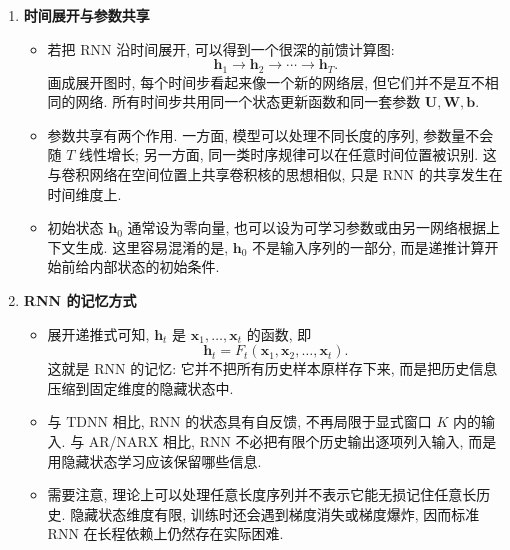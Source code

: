 \documentclass{../nndlcourse}
\begin{document}
\begin{enumerate}
  \item \textbf{时间展开与参数共享}
    \begin{itemize}
      \item 若把 RNN 沿时间展开, 可以得到一个很深的前馈计算图:
      \begin{equation*}
        \boldsymbol{h}_1 \rightarrow \boldsymbol{h}_2 \rightarrow \cdots \rightarrow \boldsymbol{h}_T.
      \end{equation*}
      画成展开图时, 每个时间步看起来像一个新的网络层, 但它们并不是互不相同的网络. 所有时间步共用同一个状态更新函数和同一套参数 $\boldsymbol{U},\boldsymbol{W},\boldsymbol{b}$.
      \item 参数共享有两个作用. 一方面, 模型可以处理不同长度的序列, 参数量不会随 $T$ 线性增长; 另一方面, 同一类时序规律可以在任意时间位置被识别. 这与卷积网络在空间位置上共享卷积核的思想相似, 只是 RNN 的共享发生在时间维度上.
      \item 初始状态 $\boldsymbol{h}_0$ 通常设为零向量, 也可以设为可学习参数或由另一网络根据上下文生成. 这里容易混淆的是, $\boldsymbol{h}_0$ 不是输入序列的一部分, 而是递推计算开始前给内部状态的初始条件.
    \end{itemize}

  \item \textbf{RNN 的记忆方式}
    \begin{itemize}
      \item 展开递推式可知, $\boldsymbol{h}_t$ 是 $\boldsymbol{x}_1,\ldots,\boldsymbol{x}_t$ 的函数, 即
      \begin{equation*}
        \boldsymbol{h}_t = F_t(\boldsymbol{x}_1,\boldsymbol{x}_2,\ldots,\boldsymbol{x}_t).
      \end{equation*}
      这就是 RNN 的记忆: 它并不把所有历史样本原样存下来, 而是把历史信息压缩到固定维度的隐藏状态中.
      \item 与 TDNN 相比, RNN 的状态具有自反馈, 不再局限于显式窗口 $K$ 内的输入. 与 AR/NARX 相比, RNN 不必把有限个历史输出逐项列入输入, 而是用隐藏状态学习应该保留哪些信息.
      \item 需要注意, 理论上可以处理任意长度序列并不表示它能无损记住任意长历史. 隐藏状态维度有限, 训练时还会遇到梯度消失或梯度爆炸, 因而标准 RNN 在长程依赖上仍然存在实际困难.
    \end{itemize}


\end{enumerate}
\end{document}
